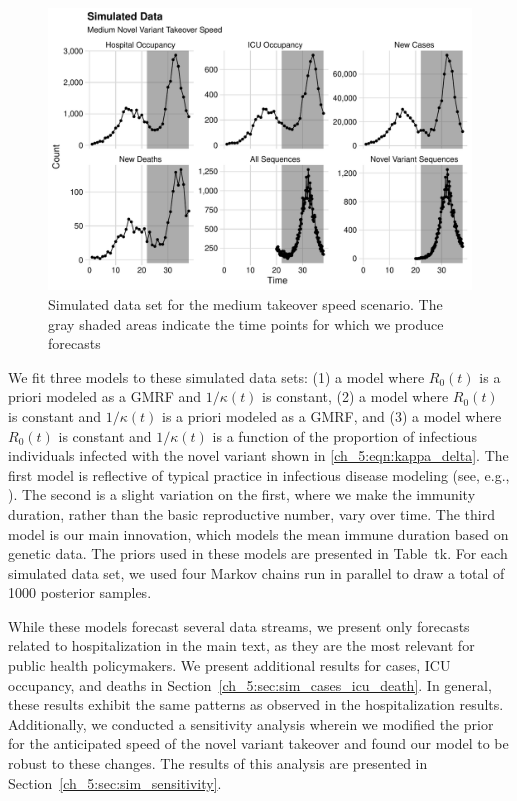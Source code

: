 \begin{figure}
    \centering
    \includegraphics[width=1.0\columnwidth]{simulated_binned_data_medium_plot}
    \caption[Simulated data set for the medium takeover speed scenario.]{Simulated data set for the medium takeover speed scenario.
    The gray shaded areas indicate the time points for which we produce forecasts}
    \label{ch_5:fig:simulated_binned_data_medium_plot}
\end{figure}


We fit three models to these simulated data sets: (1) a model where \( R_0(t) \) is a priori modeled as a GMRF and \( 1 / \kappa(t) \) is constant, (2) a model where \( R_0(t) \) is constant and \( 1 / \kappa(t) \) is a priori modeled as a GMRF, and (3) a model where \( R_0(t) \) is constant and \( 1 / \kappa(t) \) is a function of the proportion of infectious individuals infected with the novel variant shown in \eqref{ch_5:eqn:kappa_delta}.
The first model is reflective of typical practice in infectious disease modeling (see, e.g., \citep{Gibson2020real, ODea2021semi}).
The second is a slight variation on the first, where we make the immunity duration, rather than the basic reproductive number, vary over time.
The third model is our main innovation, which models the mean immune duration based on genetic data.
The priors used in these models are presented in Table~tk.
For each simulated data set, we used four Markov chains run in parallel to draw a total of 1000 posterior samples.

While these models forecast several data streams, we present only forecasts related to hospitalization in the main text, as they are the most relevant for public health policymakers.
We present additional results for cases, ICU occupancy, and deaths in Section~\ref{ch_5:sec:sim_cases_icu_death}.
In general, these results exhibit the same patterns as observed in the hospitalization results.
Additionally, we conducted a sensitivity analysis wherein we modified the prior for the anticipated speed of the novel variant takeover and found our model to be robust to these changes.
The results of this analysis are presented in Section~\ref{ch_5:sec:sim_sensitivity}.

